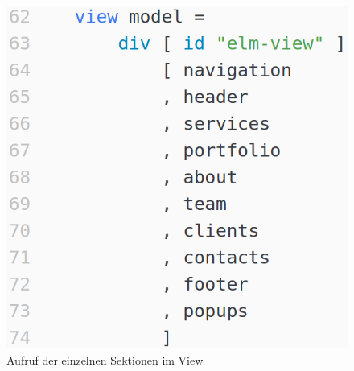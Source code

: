 \begin{figure}[h]
\centering
\includegraphics[scale=0.4]{img/elm-view-section-functions-calling.png}
\caption{Aufruf der einzelnen Sektionen im View}\label{fig:elm-view-sections-call}
\end{figure}


